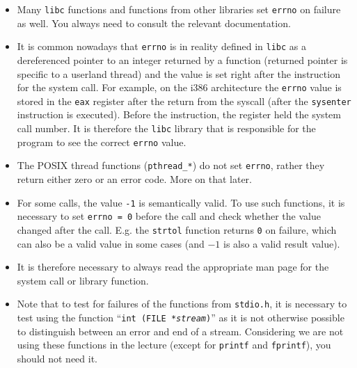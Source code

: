 \begin{itemize}
\item Many \texttt{libc} functions and functions from other libraries set
\texttt{errno} on failure as well.  You always need to consult the relevant
documentation.
\item {} It is common nowadays that \texttt{errno} is in reality
defined in \texttt{libc} as a dereferenced pointer to an integer returned by a
function (returned pointer is specific to a userland thread) and the value is
set right after the instruction for the system call.  For example, on the i386
architecture the \texttt{errno} value is stored in the \texttt{eax} register
after the return from the syscall (after the \texttt{sysenter} instruction is
executed). Before the instruction, the register held the system call number. It
is therefore the \texttt{libc} library that is responsible for the program to
see the correct \texttt{errno} value.
\item The POSIX thread functions (\texttt{pthread\_*}) do not set
\texttt{errno}, rather they return either zero or an error code.  More on that
later.
\item For some calls, the value \texttt{-1} is semantically valid. To use such
functions, it is necessary to set \texttt{errno~=~0} before the call and check
whether the value changed after the call. E.g. the \texttt{strtol} function
returns \texttt{0} on failure, which can also be a valid value in some cases
(and $-1$ is also a valid result value).
\item It is therefore necessary to always read the appropriate man page for the 
system call or library function.
\item Note that to test for failures of the functions from \texttt{stdio.h}, it
is necessary to test using the function ``\texttt{int (FILE
*\emph{stream})}'' as it is not otherwise possible to distinguish between an
error and end of a stream. Considering we are not using these functions in the
lecture (except for \texttt{printf} and \texttt{fprintf}), you should not need
it.
\end{itemize}

